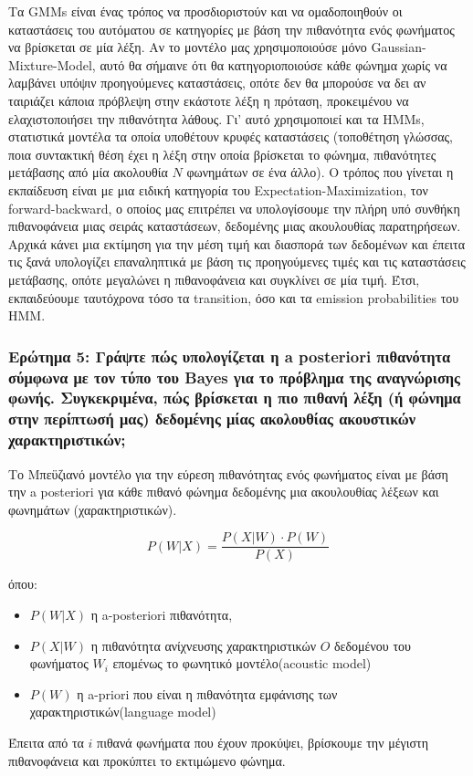 \documentclass[a4paper, 12pt]{article}
\begin{document}
        Τα GMMs είναι ένας τρόπος να προσδιοριστούν και να ομαδοποιηθούν οι καταστάσεις του αυτόματου σε κατηγορίες με βάση την πιθανότητα ενός φωνήματος να βρίσκεται σε μία λέξη. Αν το μοντέλο μας χρησιμοποιούσε μόνο Gaussian-Mixture-Model, αυτό θα σήμαινε ότι θα κατηγοριοποιούσε κάθε φώνημα χωρίς να λαμβάνει υπόψιν προηγούμενες καταστάσεις, οπότε δεν θα μπορούσε να δει αν ταιριάζει κάποια πρόβλεψη στην εκάστοτε λέξη η πρόταση, προκειμένου να ελαχιστοποιήσει την πιθανότητα λάθους. Γι' αυτό χρησιμοποιεί και τα HMMs, στατιστικά μοντέλα τα οποία υποθέτουν κρυφές καταστάσεις (τοποθέτηση γλώσσας, ποια συντακτική θέση έχει η λέξη στην οποία βρίσκεται το φώνημα, πιθανότητες μετάβασης από μία ακολουθία $N$ φωνημάτων σε ένα άλλο). Ο τρόπος που γίνεται η εκπαίδευση είναι με μια ειδική κατηγορία του Expectation-Maximization, τον forward-backward, ο οποίος μας επιτρέπει να υπολογίσουμε την πλήρη υπό συνθήκη πιθανοφάνεια μιας σειράς καταστάσεων, δεδομένης μιας ακουλουθίας παρατηρήσεων. Αρχικά κάνει μια εκτίμηση για την μέση τιμή και διασπορά  των δεδομένων και έπειτα τις ξανά υπολογίζει επαναληπτικά με βάση τις προηγούμενες τιμές και τις καταστάσεις μετάβασης, οπότε μεγαλώνει η πιθανοφάνεια και συγκλίνει σε μία τιμή. Έτσι, εκπαιδεύουμε ταυτόχρονα τόσο τα transition, όσο και τα emission probabilities του ΗΜΜ.
        
        \subsubsection*{Ερώτημα 5: Γράψτε πώς υπολογίζεται η a posteriori πιθανότητα σύμφωνα με τον τύπο του Bayes για το πρόβλημα της αναγνώρισης φωνής. Συγκεκριμένα, πώς βρίσκεται η πιο πιθανή λέξη (ή φώνημα στην περίπτωσή μας) δεδομένης μίας ακολουθίας ακουστικών χαρακτηριστικών;}
        
        Το Μπεϋζιανό μοντέλο για την εύρεση πιθανότητας ενός φωνήματος είναι με βάση την a posteriori για κάθε πιθανό φώνημα δεδομένης μια ακουλουθίας λέξεων και φωνημάτων (χαρακτηριστικών).
        
        \[
            P(W|X) = \frac{P(X|W)\cdot P(W)}{P(X)}
        \]
       
        όπου:
        \begin{itemize}
            \item $P(W|X)$ η a-posteriori πιθανότητα,
            \item $P(X|W)$ η πιθανότητα ανίχνευσης χαρακτηριστικών $Ο$ δεδομένου του φωνήματος $W_i$ επομένως το φωνητικό μοντέλο(acoustic model)
            \item $P(W)$ η a-priori που είναι η πιθανότητα εμφάνισης των χαρακτηριστικών(language model) 
        \end{itemize}
        Έπειτα από τα $i$ πιθανά φωνήματα που έχουν προκύψει, βρίσκουμε την μέγιστη πιθανοφάνεια και προκύπτει το εκτιμώμενο φώνημα. \\
        
\end{document}
